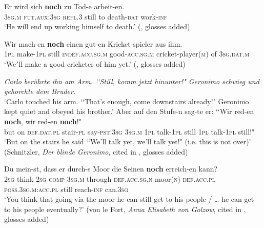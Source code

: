 \begin{exe}
	\ex\label{exAppendixGermanProspective1}
	\gll Er wird sich \textbf{noch} zu Tod-e arbeit-en.\\
	3\textsc{sg}.\textsc{m} \textsc{fut}.\textsc{aux}:3\textsc{sg} \textsc{refl}.3 still to death-\textsc{dat} work-\textsc{inf}\\
	\glt \glt \lq He will end up working himself to death.\rq{ }(\cite[141]{Koenig1991}, glosses added)
		
	\ex\label{exAppendixGermanProspective2}
	\gll Wir mach-en \textbf{noch} einen gut-en Kricket-spieler aus ihm.\\
	1\textsc{pl} make-1\textsc{pl} still \textsc{indef}.\textsc{acc}.\textsc{sg}.\textsc{m} good-\textsc{acc}.\textsc{sg}.\textsc{m} cricket-player(\textsc{m}) of 3\textsc{sg}.\textsc{dat}.\textsc{m}\\
	\glt \lq Weʼll make a good cricketer of him yet.\rq{ }(\cite[197]{Koenig1977}, glosses added)
	
	\ex\label{exAppendixGermanProspective3}
	\textit{Carlo berührte ihn am Arm. \lq\lq Still, komm jetzt hinunter!" Geronimo schwieg und gehorchte dem Bruder.}\\
	\lq Carlo touched his arm. \lq\lq That's enough, come downstairs already!" Geronimo kept quiet and obeyed his brother.\rq
	\exi{}\gll Aber auf den Stufe-n sag-te er: \lq\lq Wir red-en \textbf{noch}, wir red-en \textbf{noch}!"\\
	but on \textsc{def}.\textsc{dat}.\textsc{pl} stair-\textsc{pl} say-\textsc{pst}.3\textsc{sg} 3\textsc{sg}.\textsc{m} \phantom{\lq\lq}1\textsc{pl} talk-1\textsc{pl} still 1\textsc{pl} talk-1\textsc{pl} still!"\\
	\glt \lq But on the stairs he said \lq\lq We'll talk yet, we'll talk yet!" (i.e. this is not over)' (Schnitzler, \textit{Der blinde Geronimo}, cited in \cite[48–49]{Shetter1966}, glosses added)

	\ex\label{exAppendixGermanProspective4}
	\gll Du mein-st, dass er durch-s Moor die Seinen \textbf{noch} erreich-en kann?\\
	2\textsc{sg} think-2\textsc{sg} \textsc{comp} 3\textsc{sg}.\textsc{m} through-\textsc{def}.\textsc{acc}.\textsc{sg}.\textsc{n} moor(\textsc{n}) \textsc{def}.\textsc{acc}.\textsc{pl} \textsc{poss}.3\textsc{sg}.\textsc{m}:\textsc{acc}.\textsc{pl} still reach-\textsc{inf} can.3\textsc{sg}\\
	\glt \lq You think that going via the moor he can still get to his people / … he can get to his people eventually?' (von le Fort, \textit{Anna Elisabeth von Golzow}, cited in \cite[49]{Shetter1966}, glosses added)


\end{exe}
